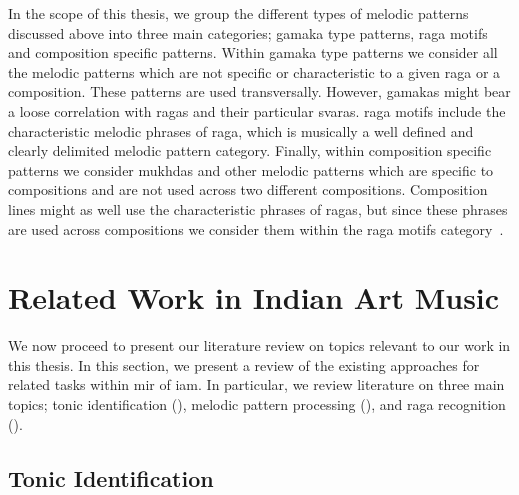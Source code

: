 In the scope of this thesis, we group the different types of melodic patterns discussed above into three main categories; \gls{gamaka} type patterns, \gls{raga} motifs and composition specific patterns. Within \gls{gamaka} type patterns we consider all the melodic patterns which are not specific or characteristic to a given \gls{raga} or a composition. These patterns are used transversally. However, \glspl{gamaka} might bear a loose correlation with  \glspl{raga} and their particular \glspl{svara}. \Gls{raga} motifs include the characteristic melodic phrases of \gls{raga}, which is musically a well defined and clearly delimited melodic pattern category. Finally, within composition specific patterns we consider \glspl{mukhda} and other melodic patterns which are specific to compositions and are not used across two different compositions. Composition lines might as well use the characteristic phrases of \glspl{raga}, but since these phrases are used across compositions we consider them within the \gls{raga} motifs category~\citep{meer1980hindustani,Bagchee1998}.


\section{Related Work in Indian Art Music}
\label{sec:background_relevant_work_iam}

We now proceed to present our literature review on topics relevant to our work in this thesis. In this section, we present a review of the existing approaches for related tasks within \gls{mir} of \gls{iam}. In particular, we review literature on three main topics; tonic identification (), melodic pattern processing (), and  \gls{raga} recognition ().  


\subsection{Tonic Identification}
\label{sec:background_relevant_work_tonic_identification}

